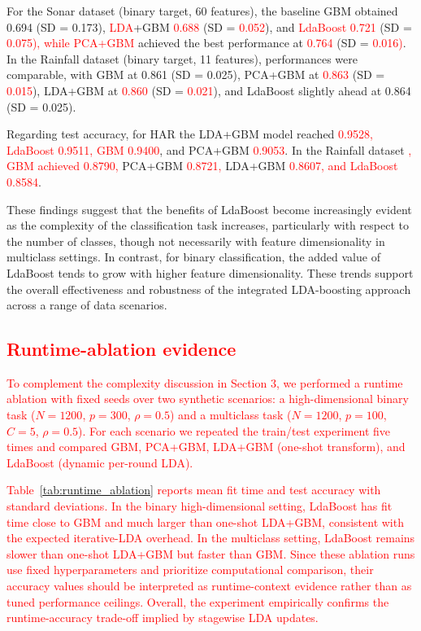 \documentclass[11pt,a4paper]{article}
\providecommand{\DIFaddtex}[1]{\textcolor{red}{#1}}
\providecommand{\DIFaddbegin}{}
\providecommand{\DIFaddend}{}
\providecommand{\DIFadd}[1]{\texorpdfstring{\DIFaddtex{#1}}{#1}}
\begin{document}
For the Sonar dataset (binary target, 60 features), the baseline GBM obtained 0.694 (SD = 0.173),  \DIFaddbegin \DIFadd{LDA}\DIFaddend +GBM  \DIFaddbegin \DIFadd{0.688 }\DIFaddend (SD =  \DIFaddbegin \DIFadd{0.052}\DIFaddend ), and  \DIFaddbegin \DIFadd{LdaBoost 0.721 }\DIFaddend (SD =  \DIFaddbegin \DIFadd{0.075), while PCA+GBM }\DIFaddend achieved the best performance at  \DIFaddbegin \DIFadd{0.764 }\DIFaddend (SD =  \DIFaddbegin \DIFadd{0.016)}\DIFaddend . In the Rainfall dataset (binary target, 11 features), performances were comparable, with GBM at 0.861 (SD = 0.025), PCA+GBM at  \DIFaddbegin \DIFadd{0.863 }\DIFaddend (SD =  \DIFaddbegin \DIFadd{0.015}\DIFaddend ), LDA+GBM at  \DIFaddbegin \DIFadd{0.860 }\DIFaddend (SD =  \DIFaddbegin \DIFadd{0.021}\DIFaddend ), and LdaBoost slightly ahead at 0.864 (SD = 0.025).

Regarding test accuracy, for HAR the LDA+GBM model reached  \DIFaddbegin \DIFadd{0.9528, LdaBoost 0.9511, GBM 0.9400}\DIFaddend , and PCA+GBM  \DIFaddbegin \DIFadd{0.9053}\DIFaddend . In the Rainfall dataset \DIFaddbegin \DIFadd{, GBM achieved 0.8790, }\DIFaddend PCA+GBM  \DIFaddbegin \DIFadd{0.8721, }\DIFaddend LDA+GBM  \DIFaddbegin \DIFadd{0.8607, and LdaBoost 0.8584}\DIFaddend .

These findings suggest that the benefits of LdaBoost become increasingly evident as the complexity of the classification task increases, particularly with respect to the number of classes, though not necessarily with feature dimensionality in multiclass settings. In contrast, for binary classification, the added value of LdaBoost tends to grow with higher feature dimensionality. These trends support the overall effectiveness and robustness of the integrated LDA-boosting approach across a range of data scenarios.

\DIFaddbegin \subsection*{\DIFadd{Runtime-ablation evidence}}
\DIFadd{To complement the complexity discussion in Section 3, we performed a runtime ablation with fixed seeds over two synthetic scenarios: a high-dimensional binary task ($N=1200$, $p=300$, $\rho=0.5$) and a multiclass task ($N=1200$, $p=100$, $C=5$, $\rho=0.5$). For each scenario we repeated the train/test experiment five times and compared GBM, PCA+GBM, LDA+GBM (one-shot transform), and LdaBoost (dynamic per-round LDA).
}

\DIFadd{Table~\ref{tab:runtime_ablation} reports mean fit time and test accuracy with standard deviations. In the binary high-dimensional setting, LdaBoost has fit time close to GBM and much larger than one-shot LDA+GBM, consistent with the expected iterative-LDA overhead. In the multiclass setting, LdaBoost remains slower than one-shot LDA+GBM but faster than GBM. Since these ablation runs use fixed hyperparameters and prioritize computational comparison, their accuracy values should be interpreted as runtime-context evidence rather than as tuned performance ceilings. Overall, the experiment empirically confirms the runtime-accuracy trade-off implied by stagewise LDA updates.
}
\end{document}

